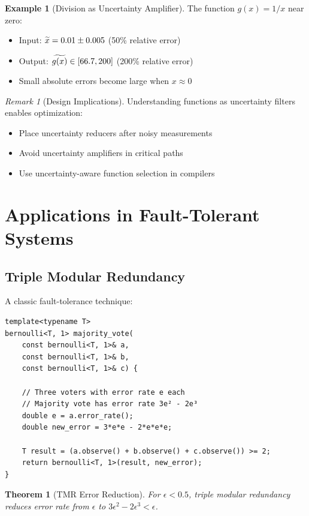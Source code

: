 \documentclass[11pt,twoside,openright]{book}
\theoremstyle{definition}
\newtheorem{example}[definition]{Example}
\theoremstyle{plain}
\newtheorem{theorem}[definition]{Theorem}
\theoremstyle{remark}
\newtheorem{remark}[definition]{Remark}
\begin{document}
\begin{example}[Division as Uncertainty Amplifier]
The function $g(x) = 1/x$ near zero:
\begin{itemize}
    \item Input: $\widetilde{x} = 0.01 \pm 0.005$ (50\% relative error)
    \item Output: $\widetilde{g(x)} \in [66.7, 200]$ (200\% relative error)
    \item Small absolute errors become large when $x \approx 0$
\end{itemize}
\end{example}

\begin{remark}[Design Implications]
Understanding functions as uncertainty filters enables optimization:
\begin{itemize}
    \item Place uncertainty reducers after noisy measurements
    \item Avoid uncertainty amplifiers in critical paths
    \item Use uncertainty-aware function selection in compilers
\end{itemize}
\end{remark}

\section{Applications in Fault-Tolerant Systems}

\subsection{Triple Modular Redundancy}

A classic fault-tolerance technique:

\begin{verbatim}
template<typename T>
bernoulli<T, 1> majority_vote(
    const bernoulli<T, 1>& a,
    const bernoulli<T, 1>& b, 
    const bernoulli<T, 1>& c) {
    
    // Three voters with error rate e each
    // Majority vote has error rate 3e² - 2e³
    double e = a.error_rate();
    double new_error = 3*e*e - 2*e*e*e;
    
    T result = (a.observe() + b.observe() + c.observe()) >= 2;
    return bernoulli<T, 1>(result, new_error);
}
\end{verbatim}

\begin{theorem}[TMR Error Reduction]
For $\epsilon < 0.5$, triple modular redundancy reduces error rate from $\epsilon$ to $3\epsilon^2 - 2\epsilon^3 < \epsilon$.
\end{theorem}
\end{document}
